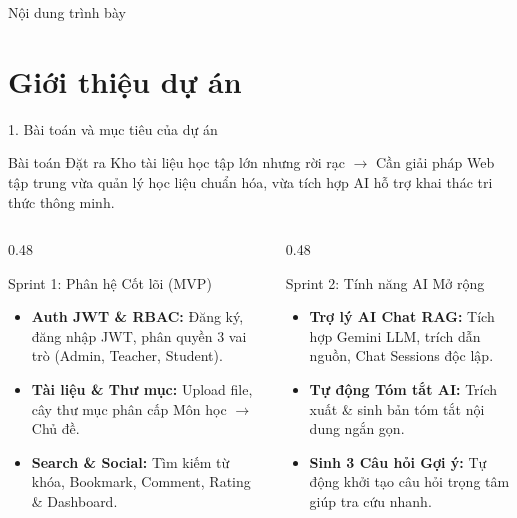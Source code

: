 \documentclass[10pt, aspectratio=169]{beamer}
\begin{document}
\begin{frame}{Nội dung trình bày}
    \tableofcontents
\end{frame}

\section{Giới thiệu dự án}

\begin{frame}{1. Bài toán và mục tiêu của dự án}
    \begin{block}{Bài toán Đặt ra}
        Kho tài liệu học tập lớn nhưng rời rạc $\rightarrow$ Cần giải pháp Web tập trung vừa quản lý học liệu chuẩn hóa, vừa tích hợp AI hỗ trợ khai thác tri thức thông minh.
    \end{block}

    \vspace{0.15cm}

    \begin{columns}[T]
        \begin{column}{0.48\textwidth}
            \begin{alertblock}{Sprint 1: Phân hệ Cốt lõi (MVP)}
                \begin{itemize}
                    \item \textbf{Auth JWT \& RBAC:} Đăng ký, đăng nhập JWT, phân quyền 3 vai trò (Admin, Teacher, Student).
                    \item \textbf{Tài liệu \& Thư mục:} Upload file, cây thư mục phân cấp Môn học $\rightarrow$ Chủ đề.
                    \item \textbf{Search \& Social:} Tìm kiếm từ khóa, Bookmark, Comment, Rating \& Dashboard.
                \end{itemize}
            \end{alertblock}
        \end{column}

        \begin{column}{0.48\textwidth}
            \begin{exampleblock}{Sprint 2: Tính năng AI Mở rộng}
                \begin{itemize}
                    \item \textbf{Trợ lý AI Chat RAG:} Tích hợp Gemini LLM, trích dẫn nguồn, Chat Sessions độc lập.
                    \item \textbf{Tự động Tóm tắt AI:} Trích xuất \& sinh bản tóm tắt nội dung ngắn gọn.
                    \item \textbf{Sinh 3 Câu hỏi Gợi ý:} Tự động khởi tạo câu hỏi trọng tâm giúp tra cứu nhanh.
                \end{itemize}
            \end{exampleblock}
        \end{column}
    \end{columns}
\end{frame}
\end{document}
